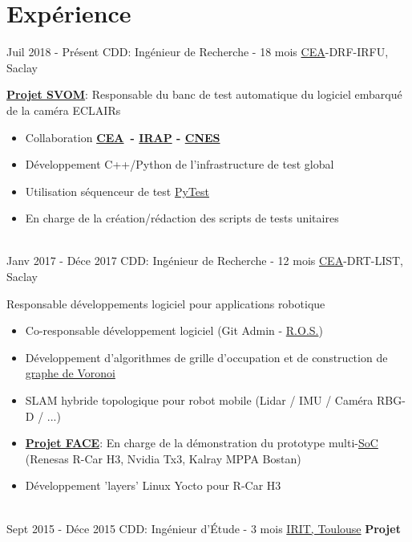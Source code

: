 \documentclass[letterpaper]{twentysecondcv} %
\newcommand{\cea}{\href{http://www.cea.fr/}{CEA}}
\newcommand{\ros}{\href{http://www.ros.org/}{R.O.S.}}
\begin{document}
\section{Expérience}
\begin{twenty} %
  \twentyitem
  {Juil 2018 -}
  {Présent}
  {CDD: Ingénieur de Recherche - 18 mois}
  {\cea-DRF-IRFU, Saclay}
  {
    \textbf{\href{http://www.svom.fr/}{Projet SVOM}}: Responsable du banc de
    test automatique du logiciel embarqué de la caméra ECLAIRs
    \begin{itemize}
    \item Collaboration \textbf{\cea\ - \href{http://www.irap.omp.eu/}{IRAP} - \href{https://cnes.fr/fr}{CNES}}
    \item Développement C++/Python de l'infrastructure de test global
    \item Utilisation séquenceur de test \href{https://docs.pytest.org/en/latest/contents.html}{PyTest}
    \item En charge de la création/rédaction des scripts de tests unitaires
    \end{itemize}
  }
  \\
  \twentyitem
  {Janv 2017 -}
  {Déce 2017}
  {CDD: Ingénieur de Recherche - 12 mois}
  {\cea-DRT-LIST, Saclay}
  {
    Responsable développements logiciel pour applications robotique
    \begin{itemize}
    \item Co-responsable développement logiciel (Git Admin - \ros)
    \item Développement d'algorithmes de grille d'occupation et de construction
      de \href{https://fr.wikipedia.org/wiki/Diagramme_de_Vorono\%C3\%AF}{graphe de Voronoi}
    \item SLAM hybride topologique pour robot mobile (Lidar / IMU / Caméra RBG-D
      / ...)
    \item
      \textbf{\href{https://www.youtube.com/watch?time_continue=3&v=mneZNnir0s0}{Projet
          FACE}}: En charge de la démonstration du prototype
      multi-\href{https://en.wikipedia.org/wiki/System_on_a_chip}{SoC} (Renesas
      R-Car H3, Nvidia Tx3, Kalray MPPA Bostan)
    \item Développement 'layers' Linux Yocto pour R-Car H3
    \end{itemize}
  }
  \\
  \twentyitem
  {Sept 2015 -}
  {Déce 2015}
  {CDD: Ingénieur d'Étude - 3 mois}
  {\href{https://www.irit.fr/?lang=fr}{IRIT, Toulouse}}
  {
    \textbf{Projet
}}
\end{twenty}
\end{document}
